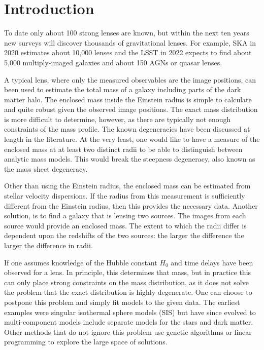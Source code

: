 \documentclass[onecolumn,galley]{mn2e}
\begin{document}
\section{Introduction}

To date only about 100 strong lenses are known, but within the next ten years
new surveys will discover thousands of gravitational lenses. For example, SKA
in 2020 estimates about 10,000 lenses and the LSST in 2022 expects to find
about 5,000 multiply-imaged galaxies and about 150 AGNs or quasar lenses.

A typical lens, where only the measured observables are the image positions,
can been used to estimate the total mass of a galaxy including parts of the
dark matter halo. The enclosed mass inside the Einstein radius is simple to
calculate and quite robust given the observed image positions. The exact mass
distribution is more difficult to determine, however, as there are typically
not enough constraints of the mass profile. The known degeneracies have been
discussed at length in the literature. At the very least, one would like to
have a measure of the enclosed mass at at least two distinct radii to be able
to distinguish between analytic mass models. This would break the steepness
degeneracy, also known as the mass sheet degeneracy.

Other than using the Einstein radius, the enclosed mass can be estimated
from stellar velocity dispersions. If the radius from this measurement
is sufficiently different from the Einstein radius, then this provides the
necessary data. Another solution, is to find a galaxy that is lensing two
sources. The images from each source would provide an enclosed mass. The
extent to which the radii differ is dependent upon the redshifts of the
two sources: the larger the difference the larger the difference in radii.

If one assumes knowledge of the Hubble constant $H_0$ and time delays have been
observed for a lens. In principle, this determines that mass, but in practice
this can only place strong constraints on the mass distribution, as it does not
solve the problem that the exact distribution is highly degenerate. One can
choose to postpone this problem and simply fit models to the given data.  The
earliest examples were singular isothermal sphere models (SIS) but have since
evolved to multi-component models include separate models for the stars and
dark matter. Other methods that do not ignore this problem use genetic
algorithms or linear programming to explore the large space of solutions.
\end{document}
